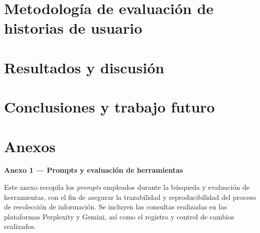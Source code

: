 \documentclass{prgrado}
\begin{document}
\chapter{Metodología de evaluación de historias de usuario}
\label{cap:evaluacion}


\chapter{Resultados y discusión}
\label{cap:resultados}


\chapter{Conclusiones y trabajo futuro}
\label{cap:conclusiones}



{ %

\backmatter %


\newpage



} %



\cleardoublepage
{}
\chapter*{Anexos}
\label{cap:anexo}

\vspace{0.75\baselineskip}
{\large\bfseries Anexo 1 — Prompts y evaluación de herramientas\par}
\vspace{0.25\baselineskip}


Este anexo recopila los \textit{prompts} empleados durante la búsqueda y evaluación de herramientas, con el fin de asegurar la trazabilidad y reproducibilidad del proceso de recolección de información. Se incluyen las consultas realizadas en las plataformas Perplexity y Gemini, así como el registro y control de cambios realizados.
\end{document}
